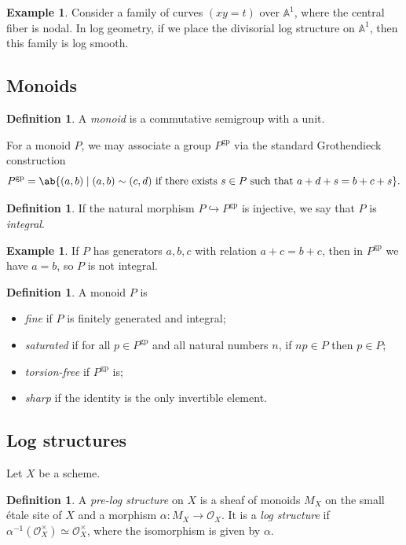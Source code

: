 \documentclass{amsart}
\theoremstyle{definition}
\newtheorem{defn}[thm]{Definition}
\newtheorem{exm}[thm]{Example}
\theoremstyle{remark}
\theoremstyle{plain}
\theoremstyle{definition}
\theoremstyle{remark}
\newcommand{\A}{\mathbb{A}}
\newcommand{\mc}[1]{\mathcal{#1}}
\newcommand{\mr}[1]{\mathrm{#1}}
\newcommand{\on}[1]{\operatorname{#1}}
\newcommand{\1}{\mathbf{1}}
\newcommand{\2}{\mathbf{2}}
\newcommand{\3}{\mathbf{3}}
\begin{document}
\begin{exm}
    Consider a family of curves \((xy=t)\) over \(\A^1\), where the central fiber is nodal. In log geometry, if we place the divisorial log structure on \(\A^1\), then this family is log smooth.
\end{exm}

\subsection{Monoids}%
\label{sub:Monoids}

\begin{defn}
    A \textit{monoid} is a commutative semigroup with a unit. 
\end{defn}

For a monoid \(P\), we may associate a group \(P^{\mr{gp}}\) via the standard Grothendieck construction
\[ P^{\mr{gp}} = \ab\{(a,b) \mid (a,b) \sim (c,d) \text{ if there exists } s \in P \text{ such that } a+d+s = b+c+s \}. \]
\begin{defn}
If the natural morphism \(P \hookrightarrow P^{\mr{gp}}\) is injective, we say that \(P\) is \textit{integral}.
\end{defn}

\begin{exm}
    If \(P\) has generators \(a,b,c\) with relation \(a+c=b+c\), then in \(P^{\on{gp}}\) we have \(a = b\), so \(P\) is not integral.
\end{exm}

\begin{defn}
    A monoid \(P\) is 
    \begin{itemize}
        \item \textit{fine} if \(P\) is finitely generated and integral;
        \item \textit{saturated} if for all \(p \in P^{\mr{gp}}\) and all natural numbers \(n\), if \(np \in P\) then \(p \in P\);
        \item \textit{torsion-free} if \(P^{\mr{gp}}\) is;
        \item \textit{sharp} if the identity is the only invertible element.
    \end{itemize}
\end{defn}

\subsection{Log structures}%
\label{sub:Log structures}

Let \(X\) be a scheme.
\begin{defn}
    A \textit{pre-log structure} on \(X\) is a sheaf of monoids \(M_X\) on the small \'etale site of \(X\) and a morphism \(\alpha \colon M_X \to \mc{O}_X\). It is a \textit{log structure} if \(\alpha^{-1}(\mc{O}_X^{\times}) \simeq \mc{O}_X^{\times}\), where the isomorphism is given by \(\alpha\). 
\end{defn}
\end{document}
